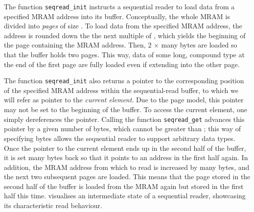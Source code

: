 The function \lstinline|seqread_init| instructs a sequential reader to load data from a specified \ac{MRAM} address into its buffer.
Conceptually, the whole \ac{MRAM} is divided into \emph{pages} of size \seqreadcachesize{}.
To load data from the specified \ac{MRAM} address, the address is rounded down the the next multiple of \seqreadcachesize{}, which yields the beginning of the page containing the \ac{MRAM} address.
Then, 2 × \seqreadcachesize{} many bytes are loaded so that the buffer holds two pages.
This way, data of some long, compound type at the end of the first page are fully loaded even if extending into the other page.

The function \lstinline|seqread_init| also returns a pointer to the corresponding position of the specified \ac{MRAM} address within the sequential-read buffer, to which we will refer as pointer to the \emph{current element}.
Due to the page model, this pointer may not be set to the beginning of the buffer.
To access the current element, one simply dereferences the pointer.
Calling the function \lstinline|seqread_get| advances this pointer by a given number of bytes, which cannot be greater than \seqreadcachesize{};
this way of specifying bytes allows the sequential reader to support arbitrary data types.
Once the pointer to the current element ends up in the second half of the buffer, it is set \seqreadcachesize{} many bytes back so that it points to an address in the first half again.
In addition, the \ac{MRAM} address from which to read is increased by \seqreadcachesize{} many bytes, and the next two subsequent pages are loaded.
This means that the page stored in the second half of the buffer is loaded from the \ac{MRAM} again but stored in the first half this time.
 visualises an intermediate state of a sequential reader, showcasing its characteristic read behaviour.

